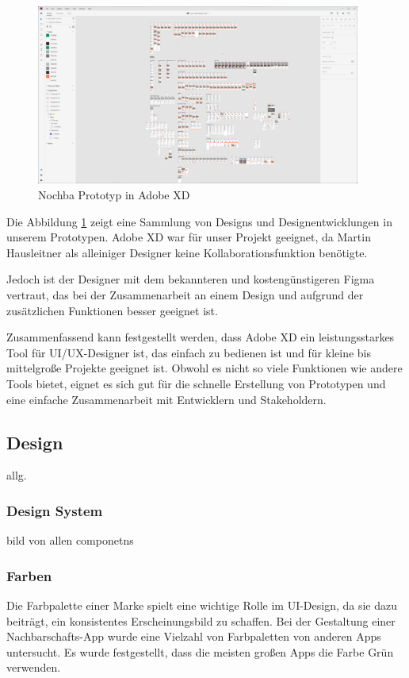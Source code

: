 \begin{figure}[h]
  \centering
  \includegraphics[width=0.95\textwidth]{pics/nochba-adobe-xd-protoype-screenshot.png}
  \caption{Nochba Prototyp in Adobe XD}
  \label{fig:adobexd-prototyp}
\end{figure}


Die Abbildung \ref{fig:adobexd-prototyp} zeigt eine
Sammlung von Designs und Designentwicklungen in unserem
Prototypen. Adobe XD war für unser Projekt geeignet, da
Martin Hausleitner als alleiniger Designer keine
Kollaborationsfunktion benötigte.

Jedoch ist der Designer mit
dem bekannteren und kostengünstigeren Figma vertraut, das
bei der Zusammenarbeit an einem Design und aufgrund der
zusätzlichen Funktionen besser geeignet ist.

Zusammenfassend kann festgestellt werden, dass Adobe XD ein leistungsstarkes Tool für UI/UX-Designer ist, das einfach zu bedienen ist und für kleine bis mittelgroße Projekte geeignet ist. Obwohl es nicht so viele Funktionen wie andere Tools bietet, eignet es sich gut für die schnelle Erstellung von Prototypen und eine einfache Zusammenarbeit mit Entwicklern und Stakeholdern.

\subsection{Design}
allg.

\subsubsection{Design System}
bild von allen componetns

\subsubsection{Farben}
Die Farbpalette einer Marke spielt eine wichtige Rolle im UI-Design, da sie dazu beiträgt, ein konsistentes Erscheinungsbild zu schaffen. Bei der Gestaltung einer Nachbarschafts-App wurde eine Vielzahl von Farbpaletten von anderen Apps untersucht. Es wurde festgestellt, dass die meisten großen Apps die Farbe Grün verwenden.

